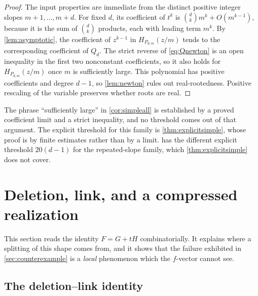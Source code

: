 \documentclass[11pt,letterpaper]{article}
\numberwithin{equation}{section}
\newtheorem{corollary}[theorem]{Corollary}
\theoremstyle{definition}
\theoremstyle{remark}
\begin{document}
\begin{proof}
The input properties are immediate from the distinct positive integer
slopes $m+1,\ldots,m+d$. For fixed $d$, its coefficient of $t^k$ is
$\binom dk m^k+O(m^{k-1})$, because it is the sum of $\binom dk$ products,
each with leading term $m^k$. By \cref{lem:asymptotic}, the coefficient of
$z^{k-1}$ in $H_{P_{d,m}}(z/m)$ tends to the corresponding coefficient of
$Q_d$. The strict reverse of \eqref{eq:Qnewton} is an open inequality in the
first two nonconstant coefficients, so it also holds for $H_{P_{d,m}}(z/m)$
once $m$ is sufficiently large. This polynomial has positive coefficients and
degree $d-1$, so \cref{lem:newton} rules out real-rootedness. Positive
rescaling of the variable preserves whether roots are real.
\end{proof}

The phrase ``sufficiently large'' in \cref{cor:simpleall} is established by a
proved coefficient limit and a strict inequality, and no threshold comes out
of that argument. The explicit threshold for this family is
\cref{thm:explicitsimple}, whose proof is by finite estimates rather than by a
limit.  has the different explicit threshold $20(d-1)$ for
the repeated-slope family, which \cref{thm:explicitsimple} does not cover.

\section{Deletion, link, and a compressed realization}\label{sec:complex}

This section reads the identity $F=G+tH$ combinatorially. It explains where a
splitting of this shape comes from, and it shows that the failure exhibited in
\cref{sec:counterexample} is a \emph{local} phenomenon which the $f$-vector
cannot see.

\subsection{The deletion--link identity}
\end{document}
